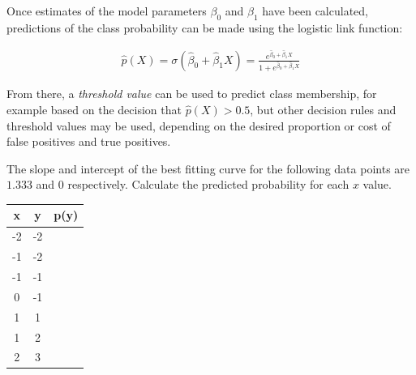Once estimates of the model parameters $\beta_0$ and $\beta_1$ have been calculated, predictions of the class probability can be made using the logistic link function:

\begin{align*}
  \hat{p}(X) = \sigma(\hat{\beta}_0 + \hat{\beta}_1 X) = \frac{e^{\hat{\beta}_0 + \hat{\beta}_1 X}}{1 + e^{\hat{\beta}_0 + \hat{\beta}_1 X}}
\end{align*}

From there, a \emph{threshold value} can be used to predict class membership, for example based on the decision that $\hat{p}(X) > 0.5$, but other decision rules and threshold values may be used, depending on the desired proportion or cost of false positives and true positives.

\begin{exerciseboxpaper}
The slope and intercept of the best fitting curve for the following data points are $1.333$ and $0$ respectively. Calculate the predicted probability for each $x$ value.

\begin{center}
\renewcommand{\arraystretch}{1.25}
\begin{tabular}{c|c|c} \hline
{\bf x} & {\bf y} & {\bf p(y)}\\ \hline
-2 & -2 & \\
-1 & -2 & \\
-1 & -1 & \\
0 & -1 & \\ 
1 & 1 & \\
1 & 2 & \\
2 & 3 & \\ \hline
\end{tabular}
\end{center}
\end{exerciseboxpaper}

